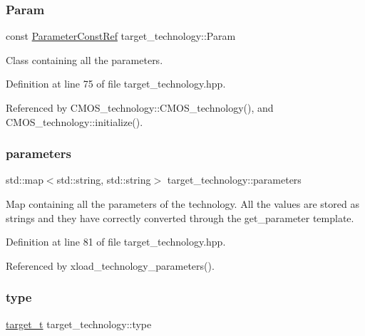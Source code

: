 \subsubsection{\texorpdfstring{Param}{Param}}
{\footnotesize\ttfamily const \hyperlink{Parameter_8hpp_a37841774a6fcb479b597fdf8955eb4ea}{Parameter\+Const\+Ref} target\+\_\+technology\+::\+Param\hspace{0.3cm}{\ttfamily [protected]}}



Class containing all the parameters. 



Definition at line 75 of file target\+\_\+technology.\+hpp.



Referenced by C\+M\+O\+S\+\_\+technology\+::\+C\+M\+O\+S\+\_\+technology(), and C\+M\+O\+S\+\_\+technology\+::initialize().

\mbox{\label{classtarget__technology_a5ceb29f981b52a8f1ab4ce1d2ff38de5}} 
\subsubsection{\texorpdfstring{parameters}{parameters}}
{\footnotesize\ttfamily std\+::map$<$std\+::string, std\+::string$>$ target\+\_\+technology\+::parameters\hspace{0.3cm}{\ttfamily [protected]}}



Map containing all the parameters of the technology. All the values are stored as strings and they have correctly converted through the get\+\_\+parameter template. 



Definition at line 81 of file target\+\_\+technology.\+hpp.



Referenced by xload\+\_\+technology\+\_\+parameters().

\mbox{\label{classtarget__technology_a0591e52e0dc59d81f3dc96f7ef9f7081}} 
\subsubsection{\texorpdfstring{type}{type}}
{\footnotesize\ttfamily \hyperlink{classtarget__technology_a84257c2d384aa7dce6a060105113459b}{target\+\_\+t} target\+\_\+technology\+::type\hspace{0.3cm}{\ttfamily [protected]}}



